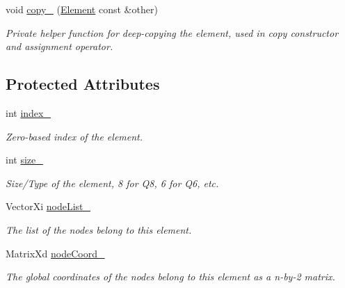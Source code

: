 \begin{DoxyCompactItemize}
\mbox{\label{class_element_a51c99ff5c8b23b9de3c82470b84ce3c0}} 
void \mbox{\hyperlink{class_element_a51c99ff5c8b23b9de3c82470b84ce3c0}{copy\+\_\+}} (\mbox{\hyperlink{class_element}{Element}} const \&other)
\begin{DoxyCompactList}\small\item\em Private helper function for deep-\/copying the element, used in copy constructor and assignment operator. \end{DoxyCompactList}\end{DoxyCompactItemize}
\subsection*{Protected Attributes}
\begin{DoxyCompactItemize}
\item 
\mbox{\label{class_element_af22d249292d2e1b2efe49ceba7dba753}} 
int \mbox{\hyperlink{class_element_af22d249292d2e1b2efe49ceba7dba753}{index\+\_\+}}
\begin{DoxyCompactList}\small\item\em Zero-\/based index of the element. \end{DoxyCompactList}\item 
\mbox{\label{class_element_a48090b4deb9efc450934223b4a6d503f}} 
int \mbox{\hyperlink{class_element_a48090b4deb9efc450934223b4a6d503f}{size\+\_\+}}
\begin{DoxyCompactList}\small\item\em Size/\+Type of the element, 8 for Q8, 6 for Q6, etc. \end{DoxyCompactList}\item 
\mbox{\label{class_element_ab23e30c8ebb0d3f88812583c2a3b475f}} 
Vector\+Xi \mbox{\hyperlink{class_element_ab23e30c8ebb0d3f88812583c2a3b475f}{node\+List\+\_\+}}
\begin{DoxyCompactList}\small\item\em The list of the nodes belong to this element. \end{DoxyCompactList}\item 
\mbox{\label{class_element_a073425885b45c2c9ad906523afe48674}} 
Matrix\+Xd \mbox{\hyperlink{class_element_a073425885b45c2c9ad906523afe48674}{node\+Coord\+\_\+}}
\begin{DoxyCompactList}\small\item\em The global coordinates of the nodes belong to this element as a n-\/by-\/2 matrix. \end{DoxyCompactList}\item 

\end{DoxyCompactItemize}
